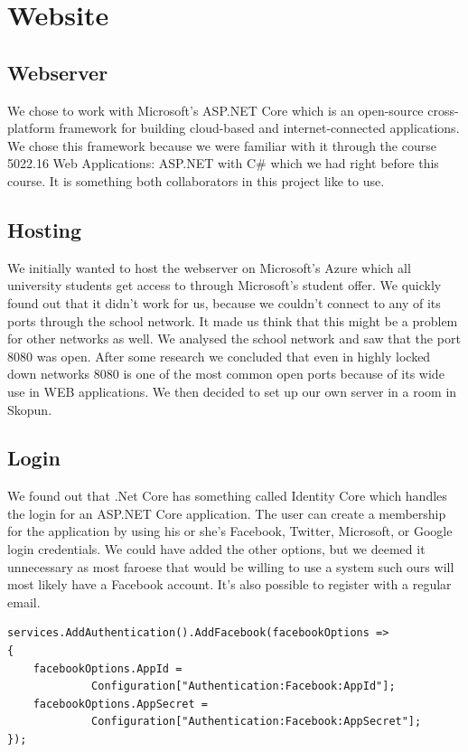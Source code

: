 \documentclass[a4paper,12pt,oneside,openright,titlepage]{book}
\begin{document}
\chapter{Website}
\section*{Webserver}
We chose to work with Microsoft's ASP.NET Core which is an open-source cross-platform framework for building cloud-based and internet-connected applications. We chose this framework because we were familiar with it through the course 5022.16 Web Applications: ASP.NET with C\# which we had right before this course. It is something both collaborators in this project like to use. 

\section{Hosting}
We initially wanted to host the webserver on Microsoft's Azure which all university students get access to through Microsoft's student offer. We quickly found out that it didn't work for us, because we couldn't connect to any of its ports through the school network. It made us think that this might be a problem for other networks as well. We analysed the school network and saw that the port 8080 was open. After some research we concluded that even in highly locked down networks 8080 is one of the most common open ports because of its wide use in WEB applications. We then decided to set up our own server in a room in Skopun.

\section{Login}
We found out that .Net Core has something called Identity Core\cite{Identity} which handles the login for an ASP.NET Core application. The user can create a membership for the application by using his or she's Facebook, Twitter, Microsoft, or Google login credentials. We could have added the other options, but we deemed it unnecessary as most faroese that would be willing to use a system such ours will most likely have a Facebook account. It's also possible to register with a regular email.

\begin{lstlisting}[language=CSharp] 
services.AddAuthentication().AddFacebook(facebookOptions =>
{
	facebookOptions.AppId =
			 Configuration["Authentication:Facebook:AppId"];
	facebookOptions.AppSecret =
			 Configuration["Authentication:Facebook:AppSecret"];
});
\end{lstlisting}
\end{document}
